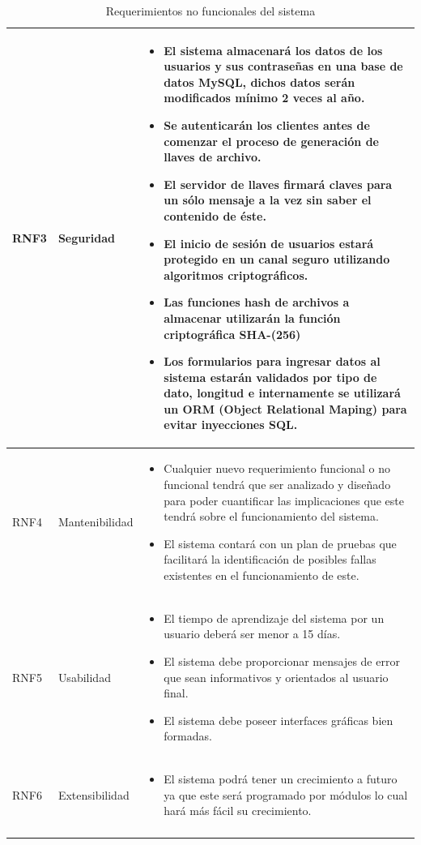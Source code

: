 \begin{longtable}{| p{1.5cm} | p{3cm} | p{11cm} |}
RNF3 & Seguridad & \begin{itemize} 
\item El sistema almacenará los datos de los usuarios y sus contraseñas en una base de datos MySQL, dichos datos serán modificados mínimo 2 veces al año. 
\item Se autenticarán los clientes antes de comenzar el proceso de generación de llaves de archivo. 
\item El servidor de llaves firmará claves para un sólo mensaje a la vez sin saber el contenido de éste. 
\item El inicio de sesión de usuarios estará protegido en un canal seguro utilizando algoritmos criptográficos. 
\item Las funciones hash de archivos a almacenar utilizarán la función criptográfica SHA-(256)
\item Los formularios para ingresar datos al sistema estarán validados por tipo de dato, longitud e internamente se utilizará un ORM (Object Relational Maping) para evitar inyecciones SQL. 
\end{itemize}

\\ \hline 
RNF4 & Mantenibilidad & \begin{itemize}
\item Cualquier nuevo requerimiento funcional o no funcional tendrá que ser analizado y diseñado para poder cuantificar las implicaciones que este tendrá sobre el funcionamiento del sistema. 
\item El sistema contará con un plan de pruebas que facilitará la identificación de posibles fallas existentes en el funcionamiento de este. 
\end{itemize}

\\ \hline
RNF5 & Usabilidad & \begin{itemize}
\item El tiempo de aprendizaje del sistema por un usuario deberá ser menor a 15 días. 
\item El sistema debe proporcionar mensajes de error que sean informativos y orientados al usuario final. 
\item El sistema debe poseer interfaces gráficas bien formadas.
\end{itemize}

\\ \hline
RNF6 & Extensibilidad & \begin{itemize}
\item El sistema podrá tener un crecimiento a futuro ya que este será programado por módulos lo cual hará más fácil su crecimiento.
\end{itemize}
\\ \hline
\caption{Requerimientos no funcionales del sistema}
\label{Requerimientos no funcionales }
\end{longtable}
